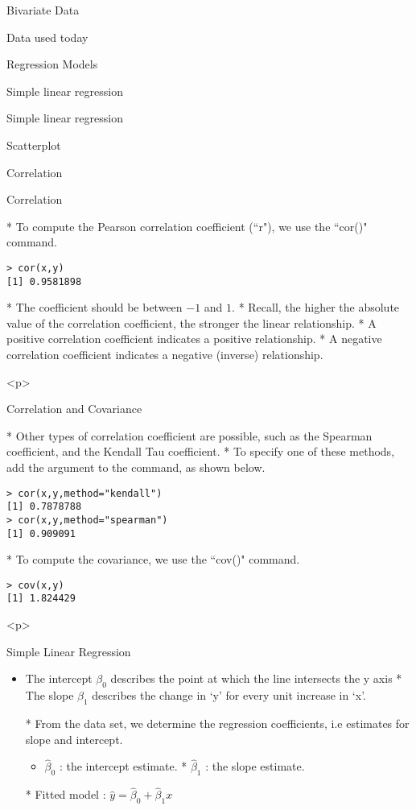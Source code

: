 \begin{slide}{Bivariate Data}
\begin{slide}{Data used today}
\begin{slide}{Regression Models}
\begin{slide}{Simple linear regression}
\begin{slide}{Simple linear regression}
\begin{slide}{Scatterplot}
\begin{slide}{Correlation}
\begin{slide}{Correlation}
\begin{itemize}
* To compute the Pearson correlation coefficient (``r"), we use the ``cor()" command.
\begin{verbatim}
> cor(x,y)
[1] 0.9581898
\end{verbatim}
* The coefficient should be between $-1$ and $1$.
* Recall, the higher the absolute value of the correlation coefficient, the stronger the linear relationship.
* A positive correlation coefficient indicates a positive relationship.
* A negative correlation coefficient indicates a negative (inverse) relationship.
\end{itemize}
<p>

\begin{slide}{Correlation and Covariance}
\begin{itemize}
* Other types of correlation coefficient are possible, such as the Spearman coefficient, and the Kendall Tau coefficient.
* To specify one of these methods, add the argument to the command, as shown below.
 \begin{verbatim}
> cor(x,y,method="kendall")
[1] 0.7878788
> cor(x,y,method="spearman")
[1] 0.909091
\end{verbatim}

* To compute the covariance, we use the ``cov()" command.
\begin{verbatim}
> cov(x,y)
[1] 1.824429
\end{verbatim}

\end{itemize}
<p>

\begin{slide}{Simple Linear Regression}



\begin{itemize}
* Basic regression model :
$y=\beta_{0} + \beta_{1}x + \epsilon$

\item
The intercept $\beta_{0}$ describes the point at which the line intersects
the y axis
* The slope $\beta_{1}$ describes the change in `y'  for every unit increase in `x'.

* From the data set, we determine the regression coefficients, i.e estimates for slope and intercept.

\begin{itemize}
\item
 $\hat{\beta}_{0}$ : the intercept estimate.
* $\hat{\beta}_{1}$ : the slope estimate.
\end{itemize}
* Fitted model : $\hat{y}=\hat{\beta}_{0} + \hat{\beta}_{1}x $
\end{itemize}



\end{slide}
\end{slide}
\end{slide}
\end{slide}
\end{slide}
\end{slide}
\end{slide}
\end{slide}
\end{slide}
\end{slide}
